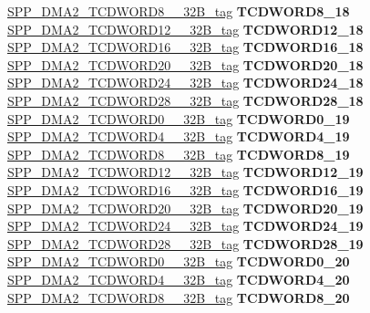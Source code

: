 \begin{DoxyCompactItemize}
\begin{tabbing}
\>\>\mbox{\hyperlink{unionSPP__DMA2__TCDWORD8____32B__tag}{SPP\_DMA2\_TCDWORD8\_\_32B\_tag}} {\bfseries TCDWORD8\_18}\\
\>\>\mbox{\hyperlink{unionSPP__DMA2__TCDWORD12____32B__tag}{SPP\_DMA2\_TCDWORD12\_\_32B\_tag}} {\bfseries TCDWORD12\_18}\\
\>\>\mbox{\hyperlink{unionSPP__DMA2__TCDWORD16____32B__tag}{SPP\_DMA2\_TCDWORD16\_\_32B\_tag}} {\bfseries TCDWORD16\_18}\\
\>\>\mbox{\hyperlink{unionSPP__DMA2__TCDWORD20____32B__tag}{SPP\_DMA2\_TCDWORD20\_\_32B\_tag}} {\bfseries TCDWORD20\_18}\\
\>\>\mbox{\hyperlink{unionSPP__DMA2__TCDWORD24____32B__tag}{SPP\_DMA2\_TCDWORD24\_\_32B\_tag}} {\bfseries TCDWORD24\_18}\\
\>\>\mbox{\hyperlink{unionSPP__DMA2__TCDWORD28____32B__tag}{SPP\_DMA2\_TCDWORD28\_\_32B\_tag}} {\bfseries TCDWORD28\_18}\\
\>\>\mbox{\hyperlink{unionSPP__DMA2__TCDWORD0____32B__tag}{SPP\_DMA2\_TCDWORD0\_\_32B\_tag}} {\bfseries TCDWORD0\_19}\\
\>\>\mbox{\hyperlink{unionSPP__DMA2__TCDWORD4____32B__tag}{SPP\_DMA2\_TCDWORD4\_\_32B\_tag}} {\bfseries TCDWORD4\_19}\\
\>\>\mbox{\hyperlink{unionSPP__DMA2__TCDWORD8____32B__tag}{SPP\_DMA2\_TCDWORD8\_\_32B\_tag}} {\bfseries TCDWORD8\_19}\\
\>\>\mbox{\hyperlink{unionSPP__DMA2__TCDWORD12____32B__tag}{SPP\_DMA2\_TCDWORD12\_\_32B\_tag}} {\bfseries TCDWORD12\_19}\\
\>\>\mbox{\hyperlink{unionSPP__DMA2__TCDWORD16____32B__tag}{SPP\_DMA2\_TCDWORD16\_\_32B\_tag}} {\bfseries TCDWORD16\_19}\\
\>\>\mbox{\hyperlink{unionSPP__DMA2__TCDWORD20____32B__tag}{SPP\_DMA2\_TCDWORD20\_\_32B\_tag}} {\bfseries TCDWORD20\_19}\\
\>\>\mbox{\hyperlink{unionSPP__DMA2__TCDWORD24____32B__tag}{SPP\_DMA2\_TCDWORD24\_\_32B\_tag}} {\bfseries TCDWORD24\_19}\\
\>\>\mbox{\hyperlink{unionSPP__DMA2__TCDWORD28____32B__tag}{SPP\_DMA2\_TCDWORD28\_\_32B\_tag}} {\bfseries TCDWORD28\_19}\\
\>\>\mbox{\hyperlink{unionSPP__DMA2__TCDWORD0____32B__tag}{SPP\_DMA2\_TCDWORD0\_\_32B\_tag}} {\bfseries TCDWORD0\_20}\\
\>\>\mbox{\hyperlink{unionSPP__DMA2__TCDWORD4____32B__tag}{SPP\_DMA2\_TCDWORD4\_\_32B\_tag}} {\bfseries TCDWORD4\_20}\\
\>\>\mbox{\hyperlink{unionSPP__DMA2__TCDWORD8____32B__tag}{SPP\_DMA2\_TCDWORD8\_\_32B\_tag}} {\bfseries TCDWORD8\_20}\\

\end{tabbing}
\end{DoxyCompactItemize}
